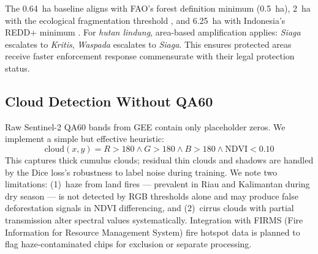 \documentclass[10pt,a4paper,twocolumn]{article}
\begin{document}
The 0.64~ha baseline aligns with FAO's forest definition minimum
(0.5~ha), 2~ha with the ecological fragmentation threshold
\cite{xu2026nature}, and 6.25~ha with Indonesia's REDD+ minimum
\cite{unfccc2022indonesia}. For \textit{hutan lindung}, area-based
amplification applies: \textit{Siaga} escalates to \textit{Kritis},
\textit{Waspada} escalates to \textit{Siaga}. This ensures protected
areas receive faster enforcement response commensurate with their
legal protection status.

\subsection{Cloud Detection Without QA60}
Raw Sentinel-2 QA60 bands from GEE contain only placeholder zeros.
We implement a simple but effective heuristic:
\[
\text{cloud}(x,y) = R{>}180 \land G{>}180 \land B{>}180
\land \text{NDVI}{<}0.10
\]
This captures thick cumulus clouds; residual thin clouds and
shadows are handled by the Dice loss's robustness to label noise
during training. We note two limitations: (1)~haze from land
fires --- prevalent in Riau and Kalimantan during dry season ---
is not detected by RGB thresholds alone and may produce false
deforestation signals in NDVI differencing, and (2)~cirrus clouds
with partial transmission alter spectral values systematically.
Integration with FIRMS (Fire Information for Resource Management
System) fire hotspot data is planned to flag haze-contaminated
chips for exclusion or separate processing.
\end{document}
